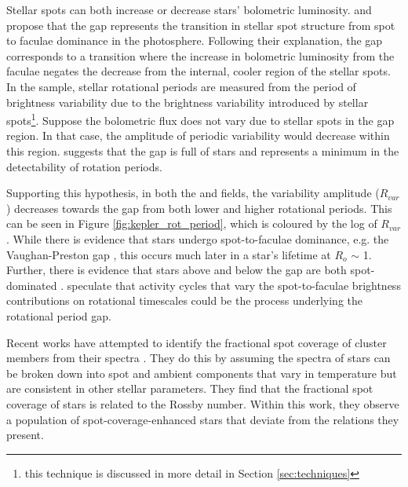 Stellar spots can both increase or decrease stars' bolometric luminosity.
 \citet{reinhold_fast_2013} and \citet{reinhold_transition_2019} propose that the gap represents the transition in stellar spot structure from spot to faculae dominance in the photosphere.
Following their explanation, the gap corresponds to a transition where the increase in bolometric luminosity from the faculae negates the decrease from the internal, cooler region of the stellar spots. 
In the \citet{mcquillan_rotation_2014} sample, stellar rotational periods are measured from the period of brightness variability due to the brightness variability introduced by stellar spots\footnote{this technique is discussed in more detail in Section \ref{sec:techniques}}.
Suppose the bolometric flux does not vary due to stellar spots in the gap region. 
In that case, the amplitude of periodic variability would decrease within this region.
\citet{reinhold_transition_2019} suggests that the gap is full of stars and represents a minimum in the detectability of rotation periods.

Supporting this hypothesis, in both the \kepler{} and \ktoo{} fields, the variability amplitude ($R_{var}$) decreases towards the gap from both lower and higher rotational periods.
This can be seen in Figure \ref{fig:kepler_rot_period}, which is coloured by the log of $R_{var}$.
While there is evidence that stars undergo spot-to-faculae dominance, e.g. the Vaughan-Preston gap \citep{vaughan_survey_1980}, this occurs much later in a star's lifetime at $R_o$ $\sim$ 1.
Further, there is evidence that stars above and below the gap are both spot-dominated  \citep{lockwood_patterns_2007, reinhold_transition_2019}.
\citet{reinhold_transition_2019} speculate that activity cycles that vary the spot-to-faculae brightness contributions on rotational timescales could be the process underlying the rotational period gap.

Recent works have attempted to identify the fractional spot coverage of cluster members from their spectra \citep{cao_starspots_2022}.
They do this by assuming the spectra of stars can be broken down into spot and ambient components that vary in temperature but are consistent in other stellar parameters.
They find that the fractional spot coverage of stars is related to the Rossby number.
Within this work, they observe a population of spot-coverage-enhanced stars that deviate from the relations they present.

